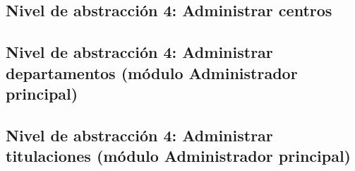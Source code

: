 \subsection{Nivel de abstracción 4: Administrar centros}



\subsection{Nivel de abstracción 4: Administrar departamentos (módulo Administrador principal)}



\subsection{Nivel de abstracción 4: Administrar titulaciones (\-mó\-dulo Administrador principal)}

